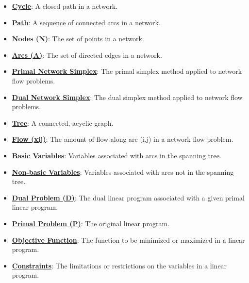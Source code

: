 \documentclass{article}%
\begin{document}
\begin{itemize}[leftmargin=*]
\item \href{https://www.math.purdue.edu/~yipn/421/2024-11-07-NetSimplex.pdf#page=4}{\textbf{Cycle}}: A closed path in a network. %
\item \href{https://www.math.purdue.edu/~yipn/421/2024-11-07-NetSimplex.pdf#page=4}{\textbf{Path}}: A sequence of connected arcs in a network. %
\item \href{https://www.math.purdue.edu/~yipn/421/2024-11-07-NetSimplex.pdf#page=1}{\textbf{Nodes (N)}}: The set of points in a network. %
\item \href{https://www.math.purdue.edu/~yipn/421/2024-11-07-NetSimplex.pdf#page=1}{\textbf{Arcs (A)}}: The set of directed edges in a network. %
\item \href{https://www.math.purdue.edu/~yipn/421/2024-11-07-NetSimplex.pdf#page=5}{\textbf{Primal Network Simplex}}: The primal simplex method applied to network flow problems. %
\item \href{https://www.math.purdue.edu/~yipn/421/2024-11-07-NetSimplex.pdf#page=32}{\textbf{Dual Network Simplex}}: The dual simplex method applied to network flow problems. %
\item \href{https://www.math.purdue.edu/~yipn/421/2024-11-07-NetSimplex.pdf#page=1}{\textbf{Tree}}: A connected, acyclic graph. %
\item \href{https://www.math.purdue.edu/~yipn/421/2024-11-07-NetSimplex.pdf#page=2}{\textbf{Flow (xij)}}: The amount of flow along arc (i,j) in a network flow problem. %
\item \href{https://www.math.purdue.edu/~yipn/421/2024-11-07-NetSimplex.pdf#page=2}{\textbf{Basic Variables}}: Variables associated with arcs in the spanning tree. %
\item \href{https://www.math.purdue.edu/~yipn/421/2024-11-07-NetSimplex.pdf#page=2}{\textbf{Non{-}basic Variables}}: Variables associated with arcs not in the spanning tree. %
\item \href{https://www.math.purdue.edu/~yipn/421/2024-11-07-NetSimplex.pdf#page=3}{\textbf{Dual Problem (D)}}: The dual linear program associated with a given primal linear program. %
\item \href{https://www.math.purdue.edu/~yipn/421/2024-11-07-NetSimplex.pdf#page=3}{\textbf{Primal Problem (P)}}: The original linear program. %
\item \href{https://www.math.purdue.edu/~yipn/421/2024-11-07-NetSimplex.pdf#page=1}{\textbf{Objective Function}}: The function to be minimized or maximized in a linear program. %
\item \href{https://www.math.purdue.edu/~yipn/421/2024-11-07-NetSimplex.pdf#page=1}{\textbf{Constraints}}: The limitations or restrictions on the variables in a linear program. %

\end{itemize}
\end{document}
